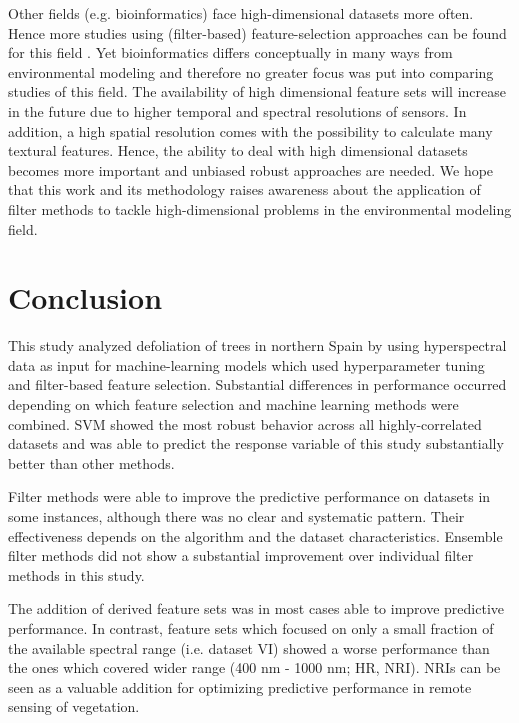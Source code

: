 \documentclass[letterpaper, peerreview, draftcls]{IEEEtran}
\begin{document}
Other fields (e.g. bioinformatics) face high-dimensional datasets more often.
Hence more studies using (filter-based) feature-selection approaches can be found for this field \cite{guo2019, radovic2017}.
Yet bioinformatics differs conceptually in many ways from environmental modeling and therefore no greater focus was put into comparing studies of this field.
The availability of high dimensional feature sets will increase in the future due to higher temporal and spectral resolutions of sensors.
In addition, a high spatial resolution comes with the possibility to calculate many textural features.
Hence, the ability to deal with high dimensional datasets becomes more important and unbiased robust approaches are needed.
We hope that this work and its methodology raises awareness about the application of filter methods to tackle high-dimensional problems in the environmental modeling field.

\section{Conclusion}

This study analyzed defoliation of trees in northern Spain by using hyperspectral data as input for machine-learning models which used hyperparameter tuning and filter-based feature selection.
Substantial differences in performance occurred depending on which feature selection and machine learning methods were combined.
SVM showed the most robust behavior across all highly-correlated datasets and was able to predict the response variable of this study substantially better than other methods.

Filter methods were able to improve the predictive performance on datasets in some instances, although there was no clear and systematic pattern.
Their effectiveness depends on the algorithm and the dataset characteristics.
Ensemble filter methods did not show a substantial improvement over individual filter methods in this study.

The addition of derived feature sets was in most cases able to improve predictive performance.
In contrast, feature sets which focused on only a small fraction of the available spectral range (i.e. dataset VI) showed a worse performance than the ones which covered wider range (400 nm - 1000 nm; HR, NRI).
NRIs can be seen as a valuable addition for optimizing predictive performance in remote sensing of vegetation.
\end{document}
